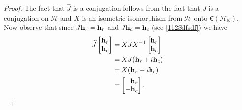 \documentclass{dis}
\theoremstyle{plain}
\theoremstyle{definition}
\def\R{\mathbb{R}}
\renewcommand{\vec}[1]{{\bf #1}}
\newcommand{\0}{{\color{lightgray}0}}
\begin{document}
\begin{proof}
The fact that $\widehat{J}$ is a conjugation follows from the fact that $J$ is a conjugation on $\mathcal{H}$ and $X$ is an isometric isomorphism from $\mathcal{H}$ onto $\mathfrak{C}(\mathcal{H}_{\R})$. Now observe that since $J \vec{h}_r = \vec{h}_r$ and $J \vec{h}_c = \vec{h}_c$ (see \eqref{112Sdfsdf}) we have
\begin{align*}
\widehat{J}\begin{bmatrix}\vec{h}_{r}\\ \vec{h}_{c}\end{bmatrix} & = X J X^{-1}\begin{bmatrix}\vec{h}_{r} \\\vec{h}_{c}\end{bmatrix} \\
& = X J (\vec{h}_{r} + i \vec{h}_{c})\\
& = X (\vec{h}_{r} - i \vec{h}_{c})\\
& =  \begin{bmatrix}\phantom{-}\vec{h}_{r} \\-\vec{h}_{c}\end{bmatrix}.
\end{align*}


\end{proof}
\end{document}
